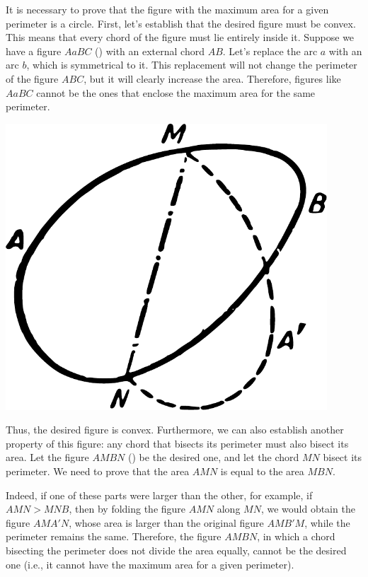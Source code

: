 It is necessary to prove that the figure with the maximum area for a given perimeter is a circle. First, let's establish that the desired figure must be convex. This means that every chord of the figure must lie entirely inside it. Suppose we have a figure \(AaBC\) () with an external chord \(AB\). Let's replace the arc \(a \) with an arc \(b \), which is symmetrical to it. This replacement will not change the perimeter of the figure \(ABC\), but it will clearly increase the area. Therefore, figures like \(AaBC\) cannot be the ones that enclose the maximum area for the same perimeter.

\begin{marginfigure}[1cm]%
\centering
\includegraphics[width=0.9\textwidth]{figures/ch-12/fig-178.pdf}
\end{marginfigure}

Thus, the desired figure is convex. Furthermore, we can also establish another property of this figure: any chord that bisects its perimeter must also bisect its area. Let the figure \(AMBN\) () be the desired one, and let the chord \(MN\) bisect its perimeter. We need to prove that the area \(AMN\) is equal to the area \(MBN\). 



Indeed, if one of these parts were larger than the other, for example, if \(AMN > MNB\), then by folding the figure \(AMN\) along \(MN\), we would obtain the figure \(AMA'N\), whose area is larger than the original figure \(AMB'M\), while the perimeter remains the same. Therefore, the figure \(AMBN\), in which a chord bisecting the perimeter does not divide the area equally, cannot be the desired one (i.e., it cannot have the maximum area for a given perimeter).

